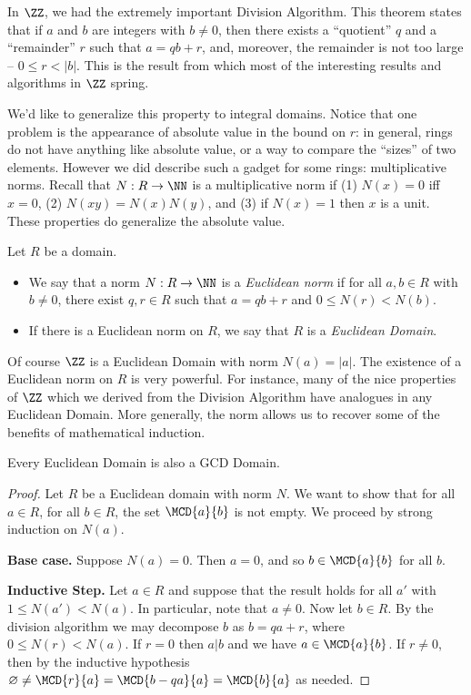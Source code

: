 \documentclass{article}
\begin{document}

In $\ZZ$, we had the extremely important Division Algorithm. This theorem states that if $a$ and $b$ are integers with $b \neq 0$, then there exists a ``quotient'' $q$ and a ``remainder'' $r$ such that $a = qb + r$, and, moreover, the remainder is not too large -- $0 \leq r < |b|$. This is the result from which most of the interesting results and algorithms in $\ZZ$ spring.

We'd like to generalize this property to integral domains. Notice that one problem is the appearance of absolute value in the bound on $r$: in general, rings do not have anything like absolute value, or a way to compare the ``sizes'' of two elements. However we did describe such a gadget for some rings: multiplicative norms. Recall that $N : R \rightarrow \NN$ is a multiplicative norm if (1) $N(x) = 0$ iff $x = 0$, (2) $N(xy) = N(x)N(y)$, and (3) if $N(x) = 1$ then $x$ is a unit. These properties do generalize the absolute value.

\begin{dfn}
Let $R$ be a domain.
\begin{itemize}
\item We say that a norm $N : R \rightarrow \NN$ is a \emph{Euclidean norm} if for all $a,b \in R$ with $b \neq 0$, there exist $q,r \in R$ such that $a = qb+r$ and $0 \leq N(r) < N(b)$.
\item If there is a Euclidean norm on $R$, we say that $R$ is a \emph{Euclidean Domain}.
\end{itemize}
\end{dfn}

Of course $\ZZ$ is a Euclidean Domain with norm $N(a) = |a|$. The existence of a Euclidean norm on $R$ is very powerful. For instance, many of the nice properties of $\ZZ$ which we derived from the Division Algorithm have analogues in any Euclidean Domain. More generally, the norm allows us to recover some of the benefits of mathematical induction.

\begin{prop}
Every Euclidean Domain is also a GCD Domain.
\end{prop}

\begin{proof}
Let $R$ be a Euclidean domain with norm $N$. We want to show that for all $a \in R$, for all $b \in R$, the set $\MCD{a}{b}$ is not empty. We proceed by strong induction on $N(a)$.

\textbf{Base case.} Suppose $N(a) = 0$. Then $a = 0$, and so $b \in \MCD{a}{b}$ for all $b$.

\textbf{Inductive Step.} Let $a \in R$ and suppose that the result holds for all $a'$ with $1 \leq N(a') < N(a)$. In particular, note that $a \neq 0$. Now let $b \in R$. By the division algorithm we may decompose $b$ as $b = qa + r$, where $0 \leq N(r) < N(a)$. If $r = 0$ then $a|b$ and we have $a \in \MCD{a}{b}$. If $r \neq 0$, then by the inductive hypothesis $\varnothing \neq \MCD{r}{a} = \MCD{b-qa}{a} = \MCD{b}{a}$ as needed.
\end{proof}
\end{document}
